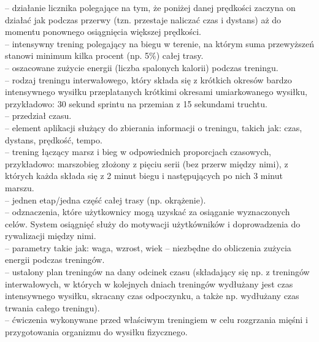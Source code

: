	\noindent{}-- działanie licznika polegające na tym, że poniżej danej prędkości zaczyna on działać jak podczas przerwy (tzn. przestaje naliczać czas i dystans) aż do momentu ponownego osiągnięcia większej prędkości.\\
	-- intensywny trening polegający na biegu w terenie, na którym suma przewyższeń stanowi minimum kilka procent (np. 5\%) całej trasy.\\
	-- oszacowane zużycie energii (liczba spalonych kalorii) podczas treningu.\\
	-- rodzaj treningu interwałowego, który składa się z krótkich okresów bardzo intensywnego wysiłku przeplatanych krótkimi okresami umiarkowanego wysiłku, przykładowo: 30 sekund sprintu na przemian z 15 sekundami truchtu.\\
	-- przedział czasu.\\
	-- element aplikacji służący do zbierania informacji o treningu, takich jak: czas, dystans, prędkość, tempo.\\
	-- trening łączący marsz i bieg w odpowiednich proporcjach czasowych, przykładowo: marszobieg złożony z pięciu serii (bez przerw między nimi), z których każda składa się z 2 minut biegu i następujących po nich 3 minut marszu.\\
	-- jednen etap/jedna część całej trasy (np. okrążenie).\\
	-- odznaczenia, które użytkownicy mogą uzyskać za osiąganie wyznaczonych celów. System osiągnięć służy do motywacji użytkówników i doprowadzenia do rywalizacji między nimi.\\
	-- parametry takie jak: waga, wzrost, wiek -- niezbędne do obliczenia zużycia energii podczas treningów.\\
	-- ustalony plan treningów na dany odcinek czasu (składający się np. z treningów interwałowych, w których w kolejnych dniach treningów wydłużany jest czas intensywnego wysiłku, skracany czas odpoczynku, a także np. wydłużany czas trwania całego treningu).\\
	-- ćwiczenia wykonywane przed właściwym treningiem w celu rozgrzania mięśni i przygotowania organizmu do wysiłku fizycznego.\\
